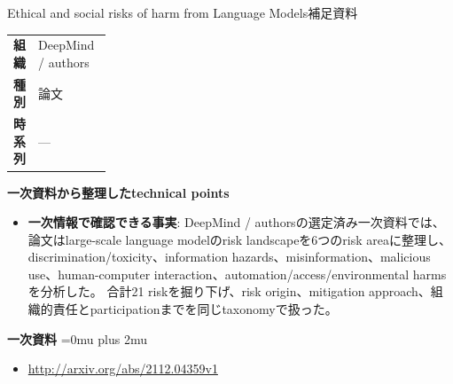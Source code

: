 \begin{technicalnote}{Ethical and social risks of harm from Language Models}{補足資料}
\begingroup
\begin{tabularx}{\linewidth}{@{}>{\bfseries}p{0.22\linewidth}X@{}}
組織 & DeepMind / authors \\
種別 & 論文 \\
時系列 & — \\
\end{tabularx}
\smallskip
{\bfseries 一次資料から整理したtechnical points}
\begin{itemize}[leftmargin=1.5em,itemsep=0.35em]
\item \textbf{一次情報で確認できる事実}: DeepMind / authorsの選定済み一次資料では、論文はlarge-scale language modelのrisk landscapeを6つのrisk areaに整理し、discrimination/toxicity、information hazards、misinformation、malicious use、human-computer interaction、automation/access/environmental harmsを分析した。 合計21 riskを掘り下げ、risk origin、mitigation approach、組織的責任とparticipationまでを同じtaxonomyで扱った。
\end{itemize}
\begin{minipage}{\linewidth}
\begin{samepage}
{\bfseries 一次資料}
\begingroup\sloppy
\Urlmuskip=0mu plus 2mu\relax
\begin{itemize}[leftmargin=1.5em,itemsep=0.25em]
\item {\scriptsize\url{http://arxiv.org/abs/2112.04359v1}}
\end{itemize}
\endgroup
\end{samepage}
\end{minipage}
\endgroup
\end{technicalnote}
\medskip
